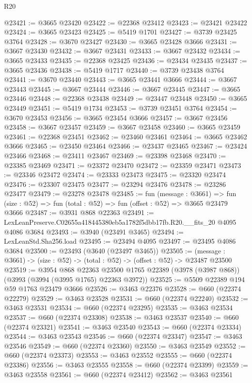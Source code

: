 \begin{lexlean}{R20}
\begin{coremodule}
@23421 := @3665 @23420
@23422 := @22368 @23412
@23423 := @23421 @23422
@23424 := @3665 @23423
@23425 := @5419 @1701
@23427 := @3739 @23425 @3764
@23428 := @3670 @23427
@23430 := @3665 @23428 @3666
@23431 := @3667 @23430
@23432 := @3667 @23431
@23433 := @3667 @23432
@23434 := @3665 @23433
@23435 := @22368 @23425
@23436 := @23434 @23435
@23437 := @3665 @23436
@23438 := @5419 @1717
@23440 := @3739 @23438 @3764
@23441 := @3670 @23440
@23443 := @3665 @23441 @3666
@23444 := @3667 @23443
@23445 := @3667 @23444
@23446 := @3667 @23445
@23447 := @3665 @23446
@23448 := @22368 @23438
@23449 := @23447 @23448
@23450 := @3665 @23449
@23451 := @5419 @1734
@23453 := @3739 @23451 @3764
@23454 := @3670 @23453
@23456 := @3665 @23454 @3666
@23457 := @3667 @23456
@23458 := @3667 @23457
@23459 := @3667 @23458
@23460 := @3665 @23459
@23461 := @22368 @23451
@23462 := @23460 @23461
@23464 := @3665 @23462 @3666
@23465 := @23450 @23464
@23466 := @23437 @23465
@23467 := @23424 @23466
@23468 := @23411 @23467
@23469 := @23398 @23468
@23470 := @23385 @23469
@23471 := @23372 @23470
@23472 := @23359 @23471
@23473 := @23346 @23472
@23474 := @23333 @23473
@23475 := @23320 @23474
@23476 := @23307 @23475
@23477 := @23294 @23476
@23478 := @23286 @23477
@23479 := @23278 @23478
@23485 := fun (message : @3661) =>
  fun (size : @52) => fun (total : @52) => fun (offset : @52) => @3665 @23479 @3666
@23487 := @3931 @868 @22363
@23491 := LexLeanPreserve.C02655a418445380eb5a1782f5dbb17fb.R20.__fits_20 @4095 @4086 @3684
@23493 := @3940 (@23491 @3465)
@23494 := LexLeanStd.Sha256.load
@23495 := @23494 @4095
@23497 := @23495 @4086 @3684
@23500 := @23493 (@3640 (@23497 @3465))
@23505 := (message : @3661) -> (size : @52) -> (total : @52) -> (offset : @52) -> @23487 @23500
@23519 := @3954
    @868
    @22363
    @23500
    @1765
    @22389
    (@3978 (@3987 @868))
    (@3993 (@3994 (@3995 @1765) @22363 @3972))
@23525 := @5509 @22389 @194 @59 @1763 @23479 @3666
@23526 := @3463 @22376
@23528 := @660 (@22374 @22279)
@23529 := @3463 @23528
@23531 := @660 (@22374 @22240)
@23532 := @3463 @23531
@23534 := @660 (@22374 @23295)
@23535 := @3463 @23534
@23537 := @660 (@22374 @23308)
@23538 := @3463 @23537
@23540 := @660 (@22374 @23321)
@23541 := @3463 @23540
@23543 := @660 (@22374 @23334)
@23544 := @3463 @23543
@23546 := @660 (@22374 @23347)
@23547 := @3463 @23546
@23549 := @660 (@22374 @23360)
@23550 := @3463 @23549
@23552 := @660 (@22374 @23373)
@23553 := @3463 @23552
@23555 := @660 (@22374 @23386)
@23556 := @3463 @23555
@23558 := @660 (@22374 @23399)
@23559 := @3463 @23558
@23561 := @660 (@22374 @23412)
@23562 := @3463 @23561

\end{coremodule}
\end{lexlean}
